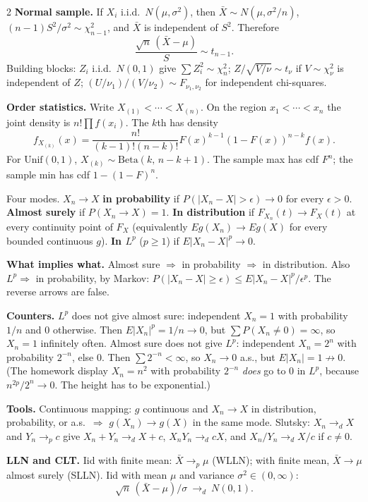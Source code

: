\documentclass{article}
\newcommand{\sect}[1]{\par\vspace{1.05pt}{\fontsize{8}{9}\selectfont\textbf{#1}}\par\vspace{0.15pt}}
\newcommand{\kw}[1]{\textbf{#1}}
\begin{document}
\begin{multicols}{2}
\kw{Normal sample.} If $X_i$ i.i.d.\ $N(\mu,\sigma^2)$, then $\bar X\sim N(\mu,\sigma^2/n)$, $(n-1)S^2/\sigma^2\sim\chi^2_{n-1}$, and $\bar X$ is independent of $S^2$. Therefore
\[
\frac{\sqrt n\,(\bar X-\mu)}{S}\sim t_{n-1}.
\]
Building blocks: $Z_i$ i.i.d.\ $N(0,1)$ give $\sum Z_i^2\sim\chi^2_n$; $Z/\sqrt{V/\nu}\sim t_\nu$ if $V\sim\chi^2_\nu$ is independent of $Z$; $(U/\nu_1)/(V/\nu_2)\sim F_{\nu_1,\nu_2}$ for independent chi-squares.

\kw{Order statistics.} Write $X_{(1)}<\cdots<X_{(n)}$. On the region $x_1<\cdots<x_n$ the joint density is $n!\prod f(x_i)$. The $k$th has density
\[
f_{X_{(k)}}(x)=\frac{n!}{(k-1)!(n-k)!}F(x)^{k-1}(1-F(x))^{n-k}f(x).
\]
For $\mathrm{Unif}(0,1)$, $X_{(k)}\sim\mathrm{Beta}(k,\,n-k+1)$. The sample max has cdf $F^n$; the sample min has cdf $1-(1-F)^n$.

\sect{3. Convergence (5.5)}
Four modes. $X_n\to X$ \kw{in probability} if $P(|X_n-X|>\epsilon)\to 0$ for every $\epsilon>0$. \kw{Almost surely} if $P(X_n\to X)=1$. \kw{In distribution} if $F_{X_n}(t)\to F_X(t)$ at every continuity point of $F_X$ (equivalently $Eg(X_n)\to Eg(X)$ for every bounded continuous $g$). \kw{In $L^p$} ($p\ge 1$) if $E|X_n-X|^p\to 0$.

\kw{What implies what.} Almost sure $\Rightarrow$ in probability $\Rightarrow$ in distribution. Also $L^p\Rightarrow$ in probability, by Markov: $P(|X_n-X|\ge\epsilon)\le E|X_n-X|^p/\epsilon^p$. The reverse arrows are false.

\kw{Counters.} $L^p$ does not give almost sure: independent $X_n=1$ with probability $1/n$ and $0$ otherwise. Then $E|X_n|^p=1/n\to 0$, but $\sum P(X_n\neq 0)=\infty$, so $X_n=1$ infinitely often. Almost sure does not give $L^p$: independent $X_n=2^n$ with probability $2^{-n}$, else $0$. Then $\sum 2^{-n}<\infty$, so $X_n\to 0$ a.s., but $E|X_n|=1\not\to 0$. (The homework display $X_n=n^2$ with probability $2^{-n}$ \emph{does} go to $0$ in $L^p$, because $n^{2p}/2^n\to 0$. The height has to be exponential.)

\kw{Tools.} Continuous mapping: $g$ continuous and $X_n\to X$ in distribution, probability, or a.s.\ $\Rightarrow$ $g(X_n)\to g(X)$ in the same mode. Slutsky: $X_n\to_d X$ and $Y_n\to_p c$ give $X_n+Y_n\to_d X+c$, $X_n Y_n\to_d cX$, and $X_n/Y_n\to_d X/c$ if $c\neq 0$.

\kw{LLN and CLT.} Iid with finite mean: $\bar X\to_p\mu$ (WLLN); with finite mean, $\bar X\to\mu$ almost surely (SLLN). Iid with mean $\mu$ and variance $\sigma^2\in(0,\infty)$:
\[
\sqrt n\,(\bar X-\mu)/\sigma\ \to_d\ N(0,1).
\]


\end{multicols}
\end{document}
